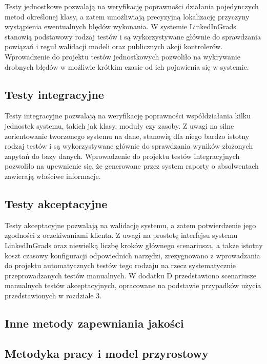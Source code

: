 Testy jednostkowe pozwalają na weryfikację poprawności działania pojedynczych metod określonej klasy, a zatem umożliwiają precyzyjną lokalizację przyczyny wystąpienia ewentualnych błędów wykonania. W systemie LinkedInGrads stanowią podstawowy rodzaj testów i są wykorzystywane głównie do sprawdzania powiązań i reguł walidacji modeli oraz publicznych akcji kontrolerów. Wprowadzenie do projektu testów jednostkowych pozwoliło na wykrywanie drobnych błędów w możliwie krótkim czasie od ich pojawienia się w systemie. 

\subsection{Testy integracyjne}
\label{Chapter712}

Testy integracyjne pozwalają na weryfikację poprawności współdziałania kilku jednostek systemu, takich jak klasy, moduły czy zasoby. Z uwagi na silne zorientowanie tworzonego systemu na dane, stanowią dla niego bardzo istotny rodzaj testów i są wykorzystywane głównie do sprawdzania wyników złożonych zapytań do bazy danych. Wprowadzenie do projektu testów integracyjnych pozwoliło na upewnienie się, że generowane przez system raporty o absolwentach zawierają właściwe informacje.

\subsection{Testy akceptacyjne}
\label{Chapter713}

Testy akceptacyjne pozwalają na walidację systemu, a zatem potwierdzenie jego zgodności z oczekiwaniami klienta. Z uwagi na prostotę interfejsu systemu LinkedInGrads oraz niewielką liczbę kroków głównego scenariusza, a także istotny koszt czasowy konfiguracji odpowiednich narzędzi, zrezygnowano z wprowadzania do projektu automatycznych testów tego rodzaju na rzecz systematycznie przeprowadzanych testów manualnych. W dodatku D przedstawiono scenariusze manualnych testów akceptacyjnych, opracowane na podstawie przypadków użycia przedstawionych w rozdziale 3.

\subsection{Inne metody zapewniania jakości}
\label{Chapter714}

\subsection{Metodyka pracy i model przyrostowy}

